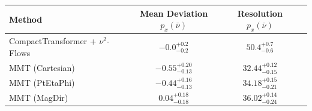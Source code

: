     \begin{tabular}{lccc}
        \toprule
        Method & Mean Deviation $p_{x}(\bar{\nu})$ & Resolution $p_{x}(\bar{\nu})$ \\
        \midrule
        CompactTransformer + $\nu^2$-Flows & $-0.0^{+0.2}_{-0.2}$ & $50.4^{+0.7}_{-0.6}$ \\
        MMT (Cartesian) & $-0.55^{+0.20}_{-0.13}$ & $32.44^{+0.12}_{-0.15}$ \\
        MMT (PtEtaPhi) & $-0.44^{+0.16}_{-0.13}$ & $34.18^{+0.15}_{-0.21}$ \\
        MMT (MagDir) & $0.04^{+0.18}_{-0.18}$ & $36.02^{+0.14}_{-0.24}$ \\
        \bottomrule
    \end{tabular}